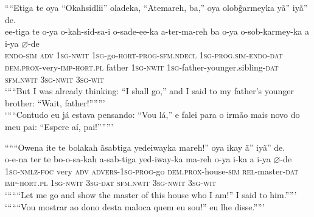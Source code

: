 \documentclass[output=paper,
modfonts,nonflat
]{langsci/langscibook}
\begin{document}
\largerpage[-2]
\ea ““Etiga te oya “Okahsidlii” oladeka, “Atemareh, ba,” oya olob\~{g}armeyka yã” iyã” de.\\[.3em]
\gll ee-tiga te o-ya o-kah-sid-sa-i o-sade-ee-ka a-ter-ma-reh{\footnotemark} ba o-ya o-sob-karmey-ka a i-ya \(\varnothing\)-de\\
\textsc{endo-sim} \textsc{adv} \textsc{1sg-nwit} \textsc{1sg}-go-\textsc{hort-prog-sfm.ndecl} \textsc{1sg-prog.sim-endo-dat} \textsc{dem.prox}-very-\textsc{imp-hort.pl} father \textsc{1sg-nwit} \textsc{1sg}-father-younger.sibling-\textsc{dat} \textsc{sfm.nwit} \textsc{3sg-nwit} \textsc{3sg-wit}\\
\glt ‘““But I was already thinking: “I shall go,” and I said to my father's younger brother: “Wait, father!”””’\\ 
\glt ‘““Contudo eu já estava pensando: “Vou lá,” e falei para o irmão mais novo do meu pai: “Espere aí, pai!”””’\\
\z

\ea “““Owena ite te bolakah ãsabtiga yedeiwayka mareh!” oya ikay ã” iyã” de.\\[.3em]
\gll o-e-na ter te bo-o-sa-kah a-sab-tiga{\footnotemark} yed-iway-ka ma-reh o-ya i-ka a i-ya \(\varnothing\)-de\\
\textsc{1sg-nmlz-foc} very \textsc{adv} \textsc{advers-1sg-prog}-go \textsc{dem.prox}-house-\textsc{sim} \textsc{rel}-master-\textsc{dat} \textsc{imp-hort.pl} \textsc{1sg-nwit} \textsc{3sg-dat} \textsc{sfm.nwit} \textsc{3sg-nwit} \textsc{3sg-wit}\\
\glt ‘“““Let me go and show the master of this house who I am!” I said to him.””’{\footnotemark}\\
\glt ‘“““Vou mostrar ao dono desta maloca quem eu sou!” eu lhe disse.””’\\
\fnminus
{}
\fnplus
{}
\z
\end{document}
